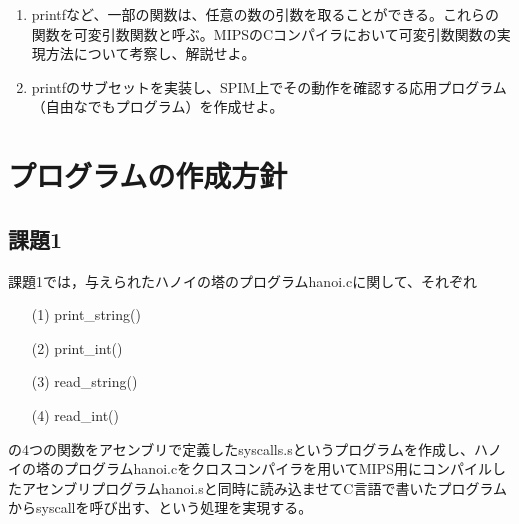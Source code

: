 \documentclass[a4j]{jarticle}
\begin{document}
\begin{enumerate}
{\baselineskip 3mm
\begin{verbatim}
int primes_stat[10];
 
char * string_ptr = "ABCDEFG";
char string_ary[] = "ABCDEFG";
 
void print_var(char *name, int val)
{
  print_string(name);
  print_string(" = ");
  print_int(val);
  print_string("\n");
}
 
main()
{
  int primes_auto[10];
 
  primes_stat[0] = 2;
  primes_auto[0] = 3;
 
  print_var("primes_stat[0]", primes_stat[0]);
  print_var("primes_auto[0]", primes_auto[0]);
}
 
\end{verbatim}
}


\item printfなど、一部の関数は、任意の数の引数を取ることができる。これらの関数を可変引数関数と呼ぶ。MIPSのCコンパイラにおいて可変引数関数の実現方法について考察し、解説せよ。

\item printfのサブセットを実装し、SPIM上でその動作を確認する応用プログラム（自由なでもプログラム）を作成せよ。

\end{enumerate}


%
%

\section{プログラムの作成方針}


\subsection{課題1}

課題1では，与えられたハノイの塔のプログラムhanoi.cに関して、それぞれ

\begin{itemize}
  \item[(1)]print\_string()
  \item[(2)]print\_int()
  \item[(3)]read\_string()
  \item[(4)]read\_int()
\end{itemize}

の4つの関数をアセンブリで定義したsyscalls.sというプログラムを作成し、ハノイの塔のプログラムhanoi.cをクロスコンパイラを用いてMIPS用にコンパイルしたアセンブリプログラムhanoi.sと同時に読み込ませてC言語で書いたプログラムからsyscallを呼び出す、という処理を実現する。
\end{document}
